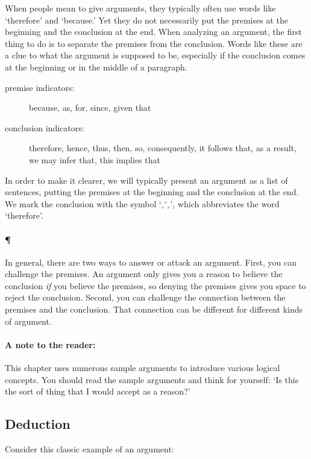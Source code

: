 \documentclass[]{article}
\newcommand*{\newbit}{\paragraph{\P}}
\newcommand*{\therefore}{${_\circ}$\hspace{-2pt}${^\circ}$\hspace{-2pt}${_\circ}$}
\newcounter{eargline}
\newcounter{OLDeargline}
\newcounter{earginstance}
\newenvironment{earglist}[1]%
{%
\bigskip
\begin{minipage}{\textwidth}
\noindent%
\setlength{\unitlength}{12pt}%
\begin{picture}(5,1)%
\put(-.5,1){\line(1,0){5}}%
\put(-.5,0){\line(0,1){1}}%
\end{picture}%
\vspace{-14pt}\\%
\textsf{#1}%
\vspace{-6pt}%
\begin{list}{\arabic{eargline}.}{\usecounter{eargline}\setlength{\itemsep}{-.4em}}%
}%
{%
\setcounter{OLDeargline}{\arabic{eargline}}\end{list}%
\vspace{-6pt}%
\begin{picture}(5,1)%
\put(-.5,1){\line(1,0){5}}%
\put(-.5,1){\line(0,1){1}}%
\end{picture}%
\end{minipage}
}
\newenvironment{earg}%
{\refstepcounter{earginstance}\begin{earglist}{Argument \#\arabic{earginstance}}}%
{\end{earglist}}
\begin{document}
When people mean to give arguments, they typically often use words like `therefore' and `because.' Yet they do not necessarily put the premises at the beginning and the conclusion at the end. When analyzing an argument, the first thing to do is to separate the premises from the conclusion. Words like these are a clue to what the argument is supposed to be, especially if the conclusion comes at the beginning or in the middle of a paragraph.

\begin{description}
\item[premise indicators:] because, as, for, since, given that
\item[conclusion indicators:] therefore, hence, thus, then, so, consequently, it follows that, as a result, we may infer that, this implies that
\end{description}

In order to make it clearer, we will typically present an argument as a list of sentences, putting the premises at the beginning and the conclusion at the end. We mark the conclusion with the symbol `\therefore', which abbreviates the word `therefore'.

\newbit
In general, there are two ways to answer or attack an argument. First, you can challenge the premises. An argument only gives you a reason to believe the conclusion \emph{if} you believe the premises, so denying the premises gives you space to reject the conclusion. Second, you can challenge the connection between the premises and the conclusion. That connection can be different for different kinds of argument.

\paragraph{A note to the reader:} This chapter uses numerous sample arguments to introduce various logical concepts. You should read the sample arguments and think for yourself: `Is this the sort of thing that I would accept as a reason?'

\subsection{Deduction}

Consider this classic example of an argument:

\end{document}
